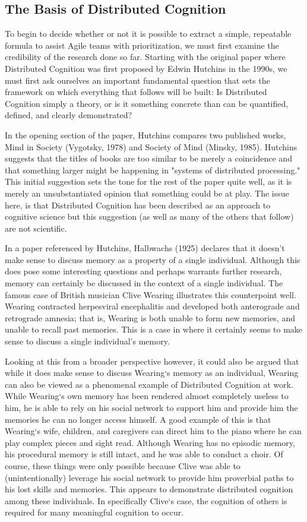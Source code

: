 \subsection{The Basis of Distributed Cognition}
To begin to decide whether or not it is possible to extract a simple, repeatable formula to assist Agile teams with prioritization, we must first examine the credibility of the research done so far. Starting with the original paper where Distributed Cognition was first proposed by Edwin Hutchins in the 1990s, we must first ask ourselves an important fundamental question that sets the framework on which everything that follows will be built: Is Distributed Cognition simply a theory, or is it something concrete than can be quantified, defined, and clearly demonstrated?

In the opening section of the paper, Hutchins compares two published works, Mind in Society (Vygotsky, 1978) and Society of Mind (Minsky, 1985). Hutchins suggests that the titles of books are too similar to be merely a coincidence and that something larger might be happening in "systems of distributed processing." \cite{hutchins2000distributed} This initial suggestion sets the tone for the rest of the paper quite well, as it is merely an unsubstantiated opinion that something could be at play. The issue here, is that Distributed Cognition has been described as an approach to cognitive science but this suggestion (as well as many of the others that follow) are not scientific.

In a paper referenced by Hutchins, Halbwachs (1925) declares that it doesn't make sense to discuss memory as a property of a single individual. Although this does pose some interesting questions and perhaps warrants further research, memory can certainly be discussed in the context of a single individual. The famous case of British musician Clive Wearing illustrates this counterpoint well. Wearing contracted herpesviral encephalitis and developed both anterograde and retrograde amnesia; that is, Wearing is both unable to form new memories, and unable to recall past memories. This is a case in where it certainly seems to make sense to discuss a single individual's memory.

Looking at this from a broader perspective however, it could also be argued that while it does make sense to discuss Wearing`s memory as an individual, Wearing can also be viewed as a phenomenal example of Distributed Cognition at work. While Wearing`s own memory has been rendered almost completely useless to him, he is able to rely on his social network to support him and provide him the memories he can no longer access himself. A good example of this is that Wearing`s wife, children, and caregivers can direct him to the piano where he can play complex pieces and sight read. Although Wearing has no episodic memory, his procedural memory is still intact, and he was able to conduct a choir. Of course, these things were only possible because Clive was able to (unintentionally) leverage his social network to provide him proverbial paths to his lost skills and memories. This appears to demonstrate distributed cognition among these individuals. In specifically Clive`s case, the cognition of others is required for many meaningful cognition to occur.

